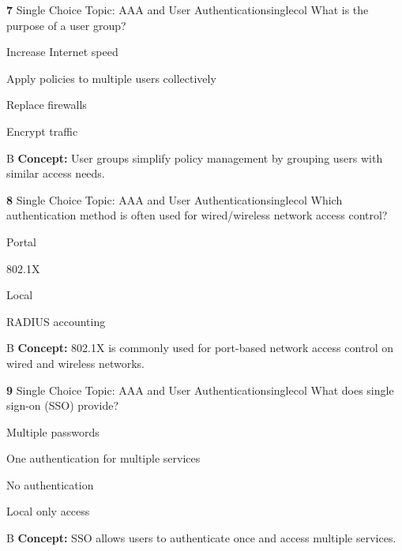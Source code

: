 \documentclass[10pt,a4paper]{article}
\begin{document}
\begin{qcard}{\color{white}\textbf{7} \hfill \small Single Choice \textbar{} Topic: AAA and User Authentication}{singlecol}
What is the purpose of a user group?

\begin{qoptions}
\item Increase Internet speed
\item Apply policies to multiple users collectively
\item Replace firewalls
\item Encrypt traffic
\end{qoptions}
\begin{explainbox}{B}
\textbf{Concept:} User groups simplify policy management by grouping users with similar access needs.
\end{explainbox}
\end{qcard}

\begin{qcard}{\color{white}\textbf{8} \hfill \small Single Choice \textbar{} Topic: AAA and User Authentication}{singlecol}
Which authentication method is often used for wired/wireless network access control?

\begin{qoptions}
\item Portal
\item 802.1X
\item Local
\item RADIUS accounting
\end{qoptions}
\begin{explainbox}{B}
\textbf{Concept:} 802.1X is commonly used for port-based network access control on wired and wireless networks.
\end{explainbox}
\end{qcard}

\begin{qcard}{\color{white}\textbf{9} \hfill \small Single Choice \textbar{} Topic: AAA and User Authentication}{singlecol}
What does single sign-on (SSO) provide?

\begin{qoptions}
\item Multiple passwords
\item One authentication for multiple services
\item No authentication
\item Local only access
\end{qoptions}
\begin{explainbox}{B}
\textbf{Concept:} SSO allows users to authenticate once and access multiple services.
\end{explainbox}
\end{qcard}
\end{document}
